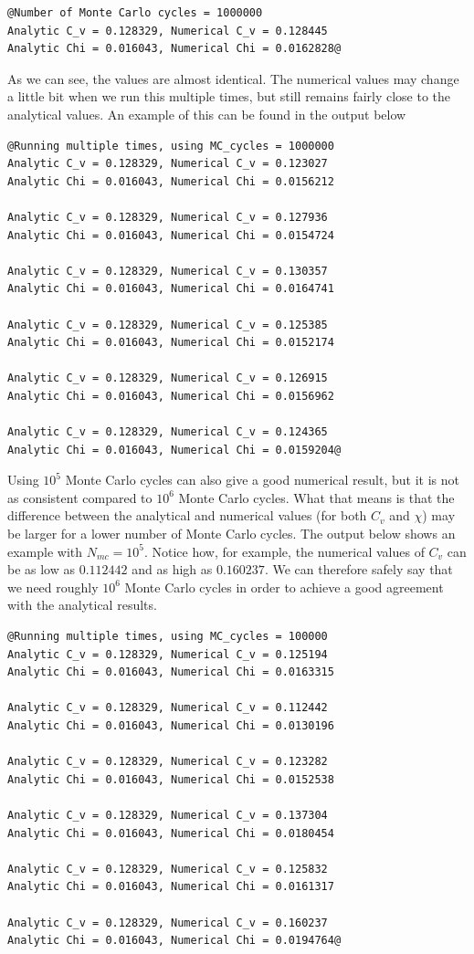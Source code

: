 \documentclass[12pt]{article}
\begin{document}
\begin{lstlisting}
@Number of Monte Carlo cycles = 1000000
Analytic C_v = 0.128329, Numerical C_v = 0.128445
Analytic Chi = 0.016043, Numerical Chi = 0.0162828@
\end{lstlisting}
As we can see, the values are almost identical. The numerical values may change a little bit when we run this multiple times, but still remains fairly close to the analytical values. An example of this can be found in the output below
\begin{lstlisting}
@Running multiple times, using MC_cycles = 1000000
Analytic C_v = 0.128329, Numerical C_v = 0.123027
Analytic Chi = 0.016043, Numerical Chi = 0.0156212
 
Analytic C_v = 0.128329, Numerical C_v = 0.127936
Analytic Chi = 0.016043, Numerical Chi = 0.0154724
 
Analytic C_v = 0.128329, Numerical C_v = 0.130357
Analytic Chi = 0.016043, Numerical Chi = 0.0164741
 
Analytic C_v = 0.128329, Numerical C_v = 0.125385
Analytic Chi = 0.016043, Numerical Chi = 0.0152174
 
Analytic C_v = 0.128329, Numerical C_v = 0.126915
Analytic Chi = 0.016043, Numerical Chi = 0.0156962
 
Analytic C_v = 0.128329, Numerical C_v = 0.124365
Analytic Chi = 0.016043, Numerical Chi = 0.0159204@
\end{lstlisting}
Using $10^5$ Monte Carlo cycles can also give a good numerical result, but it is not as consistent compared to $10^6$ Monte Carlo cycles. What that means is that the difference between the analytical and numerical values (for both $C_v$ and $\chi$) may be larger for a lower number of Monte Carlo cycles. The output below shows an example with $N_{mc} = 10^5$. Notice how, for example, the numerical values of $C_v$ can be as low as $0.112442$ and as high as $0.160237$. We can therefore safely say that we need roughly $10^6$ Monte Carlo cycles in order to achieve a good agreement with the analytical results.
\begin{lstlisting}
@Running multiple times, using MC_cycles = 100000
Analytic C_v = 0.128329, Numerical C_v = 0.125194
Analytic Chi = 0.016043, Numerical Chi = 0.0163315
 
Analytic C_v = 0.128329, Numerical C_v = 0.112442
Analytic Chi = 0.016043, Numerical Chi = 0.0130196
 
Analytic C_v = 0.128329, Numerical C_v = 0.123282
Analytic Chi = 0.016043, Numerical Chi = 0.0152538
 
Analytic C_v = 0.128329, Numerical C_v = 0.137304
Analytic Chi = 0.016043, Numerical Chi = 0.0180454
 
Analytic C_v = 0.128329, Numerical C_v = 0.125832
Analytic Chi = 0.016043, Numerical Chi = 0.0161317
 
Analytic C_v = 0.128329, Numerical C_v = 0.160237
Analytic Chi = 0.016043, Numerical Chi = 0.0194764@
\end{lstlisting}
\end{document}
